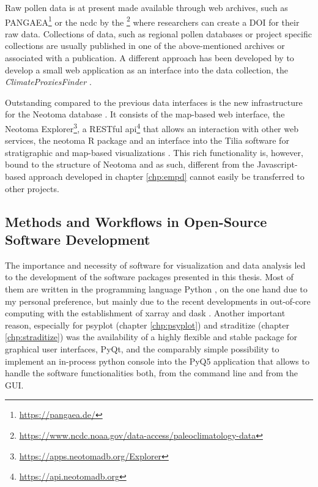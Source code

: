 \begin{refsection}
Raw pollen data is at present made available through web archives, such as PANGAEA\footnote{\url{https://pangaea.de/}} or the \gls{ncdc} by the \footnote{\url{https://www.ncdc.noaa.gov/data-access/paleoclimatology-data}} where researchers can create a DOI for their raw data. Collections of data, such as regional pollen databases or project specific collections \citep[e.g.][]{WhitmoreGajewskiSawadaEtAl2005, DavisZanonCollinsEtAl2013} are usually published in one of the above-mentioned archives or associated with a publication. A different approach has been developed by \cite{BollietBrockmannMassonDelmotteEtAl2016} to develop a small web application as an interface into the data collection, the \textit{ClimateProxiesFinder} \citep[chapter \ref{chp:empd}]{Brockmann2016}.

Outstanding compared to the previous data interfaces is the new infrastructure for the Neotoma database \citep{WilliamsGrimmBloisEtAl2018}. It consists of the map-based web interface, the Neotoma Explorer\footnote{\url{https://apps.neotomadb.org/Explorer}}, a RESTful api\footnote{\url{https://api.neotomadb.org}} that allows an interaction with other web services, the neotoma R package \citep{GoringDawsonSimpsonEtAl2015} and an interface into the Tilia software for stratigraphic and map-based visualizations \citep{WilliamsGrimmBloisEtAl2018}. This rich functionality is, however, bound to the structure of Neotoma and as such, different from the Javascript-based approach developed in chapter \ref{chp:empd} cannot easily be transferred to other projects.


\subsection{Methods and Workflows in Open-Source Software Development} \label{sec:intro-software-tools}

The importance and necessity of software for visualization and data analysis led to the development of the software packages presented in this thesis. Most of them are written in the programming language Python \citep{PerezGrangerHunter2011}, on the one hand due to my personal preference, but mainly due to the recent developments in out-of-core computing with the establishment of xarray and dask \citep{HoyerHamman2017, DDT2016, Rocklin2015}. Another important reason, especially for psyplot (chapter \ref{chp:psyplot}) and straditize (chapter \ref{chp:straditize}) was the availability of a highly flexible and stable package for graphical user interfaces, PyQt\addref, and the comparably simple possibility to implement an in-process python console into the PyQ5 application  that allows to handle the software functionalities both, from the command line and from the GUI.


\end{refsection}
